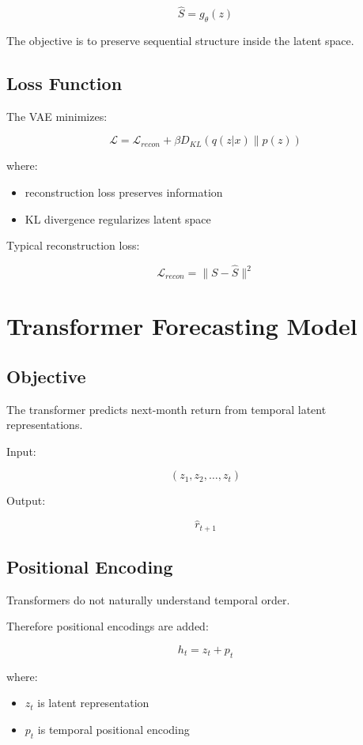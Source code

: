 \documentclass[11pt]{article}
\begin{document}
\[
\hat S = g_\theta(z)
\]

The objective is to preserve sequential structure inside the latent space.

\subsection{Loss Function}

The VAE minimizes:

\[
\mathcal{L}
=
\mathcal{L}_{recon}
+
\beta D_{KL}(q(z|x)\|p(z))
\]

where:
\begin{itemize}
    \item reconstruction loss preserves information
    \item KL divergence regularizes latent space
\end{itemize}

Typical reconstruction loss:

\[
\mathcal{L}_{recon}
=
\|S - \hat S\|^2
\]

\section{Transformer Forecasting Model}

\subsection{Objective}

The transformer predicts next-month return from temporal latent representations.

Input:

\[
(z_1, z_2, \dots, z_t)
\]

Output:

\[
\hat r_{t+1}
\]

\subsection{Positional Encoding}

Transformers do not naturally understand temporal order.

Therefore positional encodings are added:

\[
h_t = z_t + p_t
\]

where:
\begin{itemize}
    \item $z_t$ is latent representation
    \item $p_t$ is temporal positional encoding
\end{itemize}
\end{document}
